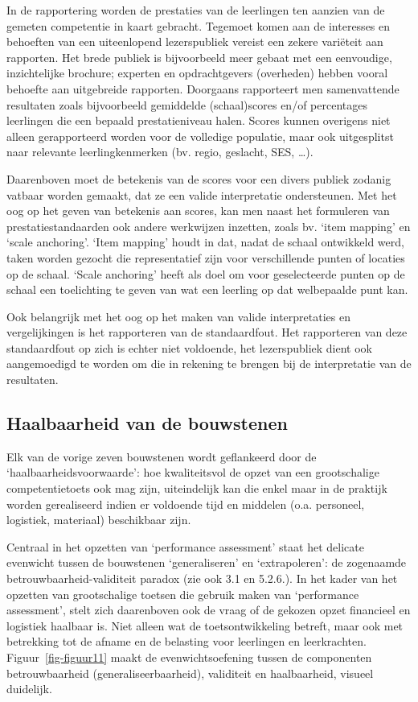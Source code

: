\documentclass[
  letterpaper,
]{report}
\begin{document}
In de rapportering worden de prestaties van de leerlingen ten aanzien
van de gemeten competentie in kaart gebracht. Tegemoet komen aan de
interesses en behoeften van een uiteenlopend lezerspubliek vereist een
zekere variëteit aan rapporten. Het brede publiek is bijvoorbeeld meer
gebaat met een eenvoudige, inzichtelijke brochure; experten en
opdrachtgevers (overheden) hebben vooral behoefte aan uitgebreide
rapporten. Doorgaans rapporteert men samenvattende resultaten zoals
bijvoorbeeld gemiddelde (schaal)scores en/of percentages leerlingen die
een bepaald prestatieniveau halen. Scores kunnen overigens niet alleen
gerapporteerd worden voor de volledige populatie, maar ook uitgesplitst
naar relevante leerlingkenmerken (bv. regio, geslacht, SES, \ldots).

Daarenboven moet de betekenis van de scores voor een divers publiek
zodanig vatbaar worden gemaakt, dat ze een valide interpretatie
ondersteunen. Met het oog op het geven van betekenis aan scores, kan men
naast het formuleren van prestatiestandaarden ook andere werkwijzen
inzetten, zoals bv. `item mapping' en `scale anchoring'. `Item mapping'
houdt in dat, nadat de schaal ontwikkeld werd, taken worden gezocht die
representatief zijn voor verschillende punten of locaties op de schaal.
`Scale anchoring' heeft als doel om voor geselecteerde punten op de
schaal een toelichting te geven van wat een leerling op dat welbepaalde
punt kan.

Ook belangrijk met het oog op het maken van valide interpretaties en
vergelijkingen is het rapporteren van de standaardfout. Het rapporteren
van deze standaardfout op zich is echter niet voldoende, het
lezerspubliek dient ook aangemoedigd te worden om die in rekening te
brengen bij de interpretatie van de resultaten.

\hypertarget{haalbaarheid-van-de-bouwstenen}{%
\subsection{Haalbaarheid van de
bouwstenen}\label{haalbaarheid-van-de-bouwstenen}}

Elk van de vorige zeven bouwstenen wordt geflankeerd door de
`haalbaarheidsvoorwaarde': hoe kwaliteitsvol de opzet van een
grootschalige competentietoets ook mag zijn, uiteindelijk kan die enkel
maar in de praktijk worden gerealiseerd indien er voldoende tijd en
middelen (o.a. personeel, logistiek, materiaal) beschikbaar zijn.

Centraal in het opzetten van `performance assessment' staat het delicate
evenwicht tussen de bouwstenen `generaliseren' en `extrapoleren': de
zogenaamde betrouwbaarheid-validiteit paradox (zie ook 3.1 en 5.2.6.).
In het kader van het opzetten van grootschalige toetsen die gebruik
maken van `performance assessment', stelt zich daarenboven ook de vraag
of de gekozen opzet financieel en logistiek haalbaar is. Niet alleen wat
de toetsontwikkeling betreft, maar ook met betrekking tot de afname en
de belasting voor leerlingen en leerkrachten. Figuur~\ref{fig-figuur11}
maakt de evenwichtsoefening tussen de componenten betrouwbaarheid
(generaliseerbaarheid), validiteit en haalbaarheid, visueel duidelijk.
\end{document}
